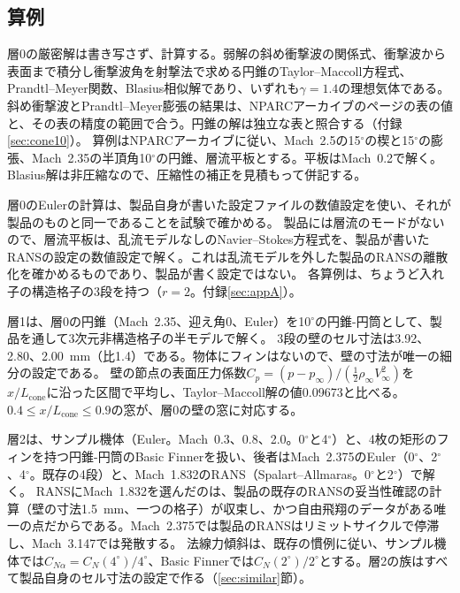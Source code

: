 \documentclass[twocolumn]{labreport}
\newcommand{\Cp}{C_p}
\newcommand{\CNa}{C_{N\alpha}}
\newcommand{\pinf}{p_\infty}
\begin{document}
\subsection{算例}
\label{sec:cases}
\label{sec:exact}
\label{sec:l0setup}
\label{sec:l12setup}

層0の厳密解は書き写さず、計算する。弱解の斜め衝撃波の関係式、衝撃波から表面まで積分し衝撃波角を射撃法で求める円錐のTaylor--Maccoll方程式、Prandtl--Meyer関数、Blasius相似解\citep{blasius1908,schlichting2017}であり、いずれも$\gamma=1.4$の理想気体である。
斜め衝撃波とPrandtl--Meyer膨張の結果は、NPARCアーカイブのページの表の値\citep{nparc_wedge,nparc_pm15}と、その表の精度の範囲で合う。円錐の解は独立な表と照合する（付録\ref{sec:cone10}）。
算例はNPARCアーカイブ\citep{nparc_archive}に従い、Mach~2.5の15$^\circ$の楔と15$^\circ$の膨張、Mach~2.35の半頂角10$^\circ$の円錐、層流平板とする。平板はMach~0.2で解く。
Blasius解は非圧縮なので、圧縮性の補正を見積もって併記する。

層0のEulerの計算は、製品自身が書いた設定ファイルの数値設定を使い、それが製品のものと同一であることを試験で確かめる。
製品には層流のモードがないので、層流平板は、乱流モデルなしのNavier--Stokes方程式を、製品が書いたRANSの設定の数値設定で解く。これは乱流モデルを外した製品のRANSの離散化を確かめるものであり、製品が書く設定ではない。
各算例は、ちょうど入れ子の構造格子の3段を持つ（$r=2$。付録\ref{sec:appA}）。

層1は、層0の円錐（Mach~2.35、迎え角0、Euler）を10$^\circ$の円錐-円筒として、製品を通して3次元非構造格子の半モデルで解く。
3段の壁のセル寸法は3.92、2.80、2.00~mm（比1.4）である。物体にフィンはないので、壁の寸法が唯一の細分の設定である。
壁の節点の表面圧力係数$\Cp=(p-\pinf)/(\tfrac12\rho_\infty V_\infty^2)$を$x/L_\mathrm{cone}$に沿った区間で平均し、Taylor--Maccoll解の値0.09673と比べる。$0.4\le x/L_\mathrm{cone}\le0.9$の窓が、層0の壁の窓に対応する。

層2は、サンプル機体（Euler。Mach~0.3、0.8、2.0。0$^\circ$と4$^\circ$）と、4枚の矩形のフィンを持つ円錐-円筒のBasic Finnerを扱い、後者はMach~2.375のEuler（0$^\circ$、2$^\circ$、4$^\circ$。既存の4段）と、Mach~1.832のRANS（Spalart--Allmaras。0$^\circ$と2$^\circ$）で解く。
RANSにMach~1.832を選んだのは、製品の既存のRANSの妥当性確認の計算（壁の寸法1.5~mm、一つの格子）が収束し、かつ自由飛翔のデータがある唯一の点だからである。Mach~2.375では製品のRANSはリミットサイクルで停滞し、Mach~3.147では発散する。
法線力傾斜は、既存の慣例に従い、サンプル機体では$\CNa=C_N(4^\circ)/4^\circ$、Basic Finnerでは$C_N(2^\circ)/2^\circ$とする。層2の族はすべて製品自身のセル寸法の設定で作る（\ref{sec:similar}節）。
\end{document}
